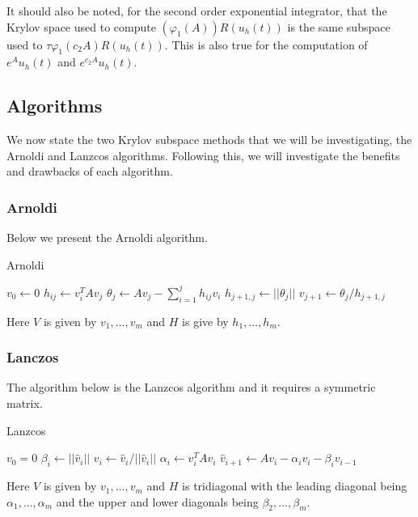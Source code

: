 It should also be noted, for the second order exponential integrator, that the Krylov space used to compute $(\varphi_1(A))R(u_h(t))$ is the same subspace used to $\tau\varphi_1(c_2 A)R(u_h(t))$.
This is also true for the computation of $e^{A}u_h(t)$ and $e^{c_2A}u_h(t)$.

\subsection{Algorithms}
We now state the two Krylov subspace methods that we will be investigating, the Arnoldi and Lanzcos algorithms.
Following this, we will investigate the benefits and drawbacks of each algorithm.

\subsubsection{Arnoldi}
Below we present the Arnoldi algorithm.
\begin{algorithm}[H]
\caption{Arnoldi \cite{Higham2008}} %
\begin{algorithmic}
\State $v_0 \gets 0$
\State$h_{ij} \gets v_i^T A v_j$
\EndFor
\State$\theta_j \gets Av_j - \sum^j_{i=1} h_{ij}v_i$
\State$h_{j+1,j} \gets ||\theta_j||$
\State$v_{j+1} \gets \theta_j/h_{j+1,j}$
\EndFor
\EndProcedure
\end{algorithmic}
\end{algorithm}
Here $V$ is given by $v_1,...,v_m$ and $H$ is give by $h_1,...,h_m$.\\

\subsubsection{Lanczos}
The algorithm below is the Lanzcos algorithm and it requires a symmetric matrix. \cite{Moler2003}
\begin{algorithm}[H]
\caption{Lanzcos\cite{OJALVO1970}}
\begin{algorithmic}
\State $v_0 = 0$
\State$\beta_i \gets || \hat v_i ||$
\State$v_i \gets \hat v_i / || \hat v_i ||$
\State$\alpha_i \gets v_i^T A v_i$
\State$\hat v_{i+1} \gets Av_i - \alpha_iv_i - \beta_iv_{i-1}$
\EndFor
\EndProcedure
\end{algorithmic}
\end{algorithm}
Here $V$ is given by ${v_1,...,v_m}$ and $H$ is tridiagonal with the leading diagonal being $\alpha_1, ..., \alpha_m$ and the upper and lower diagonals being $\beta_2,...,\beta_m$.

